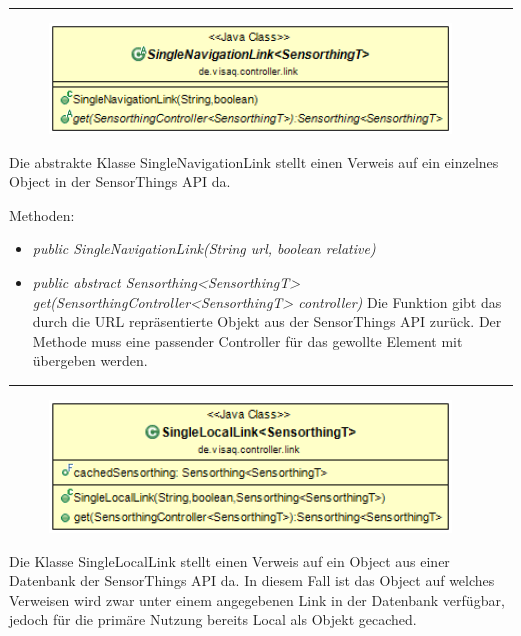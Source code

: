 \rule{\textwidth}{0.4pt}
\begin{minipage}{0.4\textwidth}
    \begin{figure}[H]
        {\centering\includegraphics[width=0.95\textwidth]{media/backend/controller/classes/SingleNavigationLink.png}}
    \end{figure}
    \end{minipage} \hfill
\begin{minipage}{0.6\textwidth}
    Die abstrakte Klasse SingleNavigationLink stellt einen Verweis auf ein einzelnes Object in der \gls{SensorThings API} da.
\end{minipage}

Methoden:
\begin{itemize}
    \item \emph{public SingleNavigationLink(String url, boolean relative)}
    \relativeDescription
    \item \emph{public abstract Sensorthing<SensorthingT> get(SensorthingController<SensorthingT> controller)}
    Die Funktion gibt das durch die URL repräsentierte Objekt aus der \gls{SensorThings API} zurück.
    Der Methode muss eine passender Controller für das gewollte Element mit übergeben werden.
\end{itemize}

\rule{\textwidth}{0.4pt}
\begin{minipage}{0.4\textwidth}
    \begin{figure}[H]
        {\centering\includegraphics[width=0.95\textwidth]{media/backend/controller/classes/SingleLocalLink.png}}
    \end{figure}
    \end{minipage} \hfill
\begin{minipage}{0.6\textwidth}
    Die Klasse SingleLocalLink stellt einen Verweis auf ein Object aus einer Datenbank der \gls{SensorThings API} da.
    In diesem Fall ist das Object auf welches Verweisen wird zwar unter einem angegebenen Link in der Datenbank verfügbar, jedoch für die primäre Nutzung bereits Local als Objekt gecached.
\end{minipage}

